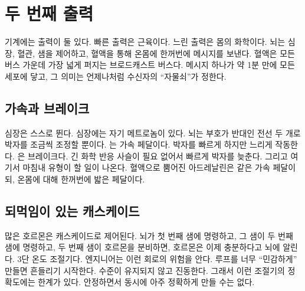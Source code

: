 \chapter{두 번째 출력}

기계에는 출력이 둘 있다. 빠른 출력은 근육이다. 느린 출력은 몸의 화학이다. 뇌는 심장, 혈관, 샘을 제어하고, 혈액을 통해 온몸에 한꺼번에 메시지를 보낸다. 혈액은 모든 버스 가운데 가장 넓게 퍼지는 브로드캐스트 버스다. 메시지 하나가 약 1분 만에 모든 세포에 닿고, 그 의미는 언제나처럼 수신자의 “자물쇠”가 정한다.

\section*{가속과 브레이크}

심장은 스스로 뛴다. 심장에는 자기 메트로놈이 있다. 뇌는 부호가 반대인 전선 두 개로 박자를 조금씩 조정할 뿐이다. 는 가속 페달이다. 박자를 빠르게 하지만 느리게 작동한다. 은 브레이크다. 긴 화학 반응 사슬이 필요 없어서 빠르게 박자를 늦춘다. 그리고 여기서 마침내  유형이 할 일이 나온다. 혈액으로 뿜어진 아드레날린은 같은 가속 페달이되, 온몸에 대해 한꺼번에 밟은 페달이다.


\section*{되먹임이 있는 캐스케이드}

많은 호르몬은 캐스케이드로 제어된다. 뇌가 첫 번째 샘에 명령하고, 그 샘이 두 번째 샘에 명령하고, 두 번째 샘이 호르몬을 분비하면, 호르몬은 이제 충분하다고 뇌에 알린다. 3단 온도 조절기다. 엔지니어는 이런 회로의 위험을 안다. 루프를 너무 “민감하게” 만들면 흔들리기 시작한다. 수준이 유지되지 않고 진동한다. 그래서 이런 조절기의 정확도에는 한계가 있다. 안정하면서 동시에 아주 정확하게 만들 수는 없다.

